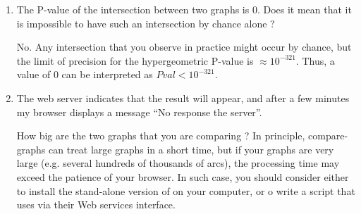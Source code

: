 \begin{enumerate}

\item The P-value of the intersection between two graphs is 0. Does it
  mean that it is impossible to have such an intersection by chance
  alone ?

  No. Any intersection that you observe in practice might occur by
  chance, but the limit of precision for the hypergeometric P-value is
  $\approx 10^{-321}$. Thus, a value of 0 can be interpreted as $Pval <
  10^{-321}.$

\item The web server indicates that the result will appear, and after
  a few minutes my browser displays a message ``No response the
  server''.

  How big are the two graphs that you are comparing ? In principle,
  compare-graphs can treat large graphs in a short time, but if your
  graphs are very large (e.g. several hundreds of thousands of arcs),
  the processing time may exceed the patience of your browser. In such
  case, you should consider either to install the stand-alone version
  of \neat on your computer, or o write a script that uses \neat via
  their Web services interface.

\end{enumerate}